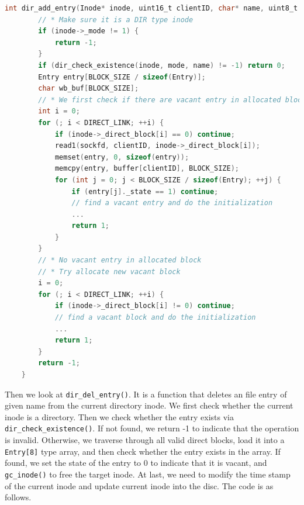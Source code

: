 \begin{lstlisting}[language=C]
    int dir_add_entry(Inode* inode, uint16_t clientID, char* name, uint8_t mode) {
        // * Make sure it is a DIR type inode
        if (inode->_mode != 1) {
            return -1;
        }
        if (dir_check_existence(inode, mode, name) != -1) return 0;
        Entry entry[BLOCK_SIZE / sizeof(Entry)];
        char wb_buf[BLOCK_SIZE];
        // * We first check if there are vacant entry in allocated block
        int i = 0;
        for (; i < DIRECT_LINK; ++i) {
            if (inode->_direct_block[i] == 0) continue;
            read1(sockfd, clientID, inode->_direct_block[i]);
            memset(entry, 0, sizeof(entry));
            memcpy(entry, buffer[clientID], BLOCK_SIZE);
            for (int j = 0; j < BLOCK_SIZE / sizeof(Entry); ++j) {
                if (entry[j]._state == 1) continue;
                // find a vacant entry and do the initialization
                ... 
                return 1;
            }
        }
        // * No vacant entry in allocated block
        // * Try allocate new vacant block
        i = 0;
        for (; i < DIRECT_LINK; ++i) {
            if (inode->_direct_block[i] != 0) continue;
            // find a vacant block and do the initialization
            ... 
            return 1;
        }
        return -1;
    }    
\end{lstlisting}

Then we look at \texttt{dir_del_entry()}. It is a function that deletes an file entry of given name from the current directory inode.
We first check whether the current inode is a directory. Then we check whether the entry exists via \texttt{dir\_check\_existence()}. If not found, we return -1 to indicate that the operation is invalid.
Otherwise, we traverse through all valid direct blocks, load it into a \texttt{Entry[8]} type array, and then check whether the entry exists in the array. If found, we set the state of the entry to 0 to indicate that it is vacant, and \texttt{gc\_inode()} to free the target inode.
At last, we need to modify the time stamp of the current inode and update current inode into the disc. The code is as follows.

